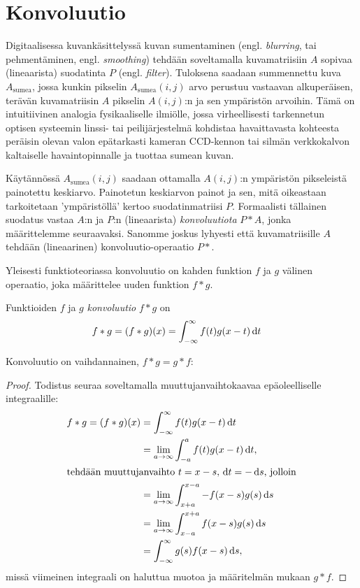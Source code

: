 \section{Konvoluutio}
\label{sec:konvoluutio}

Digitaalisessa kuvankäsittelyssä kuvan sumentaminen (engl. \emph{blurring}, tai pehmentäminen, engl. \emph{smoothing}) tehdään soveltamalla kuvamatriisiin $A$ sopivaa (lineaarista) suodatinta $P$ (engl. \emph{filter}).
Tuloksena saadaan summennettu kuva $A_\text{sumea}$, jossa kunkin pikselin $A_\text{sumea}(i,j)$ arvo perustuu vastaavan alkuperäisen, terävän kuvamatriisin $A$ pikselin $A(i,j)$:n ja sen ympäristön arvoihin.
Tämä on intuitiivinen analogia fysikaaliselle ilmiölle, jossa virheellisesti tarkennetun optisen systeemin linssi- tai peilijärjestelmä kohdistaa havaittavasta kohteesta peräisin olevan valon epätarkasti kameran CCD-kennon tai silmän verkkokalvon kaltaiselle havaintopinnalle ja tuottaa sumean kuvan.

Käytännössä $A_\text{sumea}(i,j)$ saadaan ottamalla $A(i,j)$:n ympäristön pikseleistä painotettu keskiarvo.
Painotetun keskiarvon painot ja sen, mitä oikeastaan tarkoitetaan 'ympäristöllä' kertoo suodatinmatriisi $P$.
Formaalisti tällainen suodatus vastaa $A$:n ja $P$:n (lineaarista) \emph{konvoluutiota} $P \ast A$, jonka määrittelemme seuraavaksi.
Sanomme joskus lyhyesti että kuvamatriisille $A$ tehdään (lineaarinen) konvoluutio-operaatio $P \ast$.
\cite{burger09}

Yleisesti funktioteoriassa konvoluutio on kahden funktion $f$ ja $g$ välinen operaatio, joka määrittelee uuden funktion $f \ast g$.
\begin{maar}
    Funktioiden $f$ ja $g$ \emph{konvoluutio} $f \ast g$ on
    \begin{align*}
        f \ast g = (f \ast g) (x)
        &= \int_{-\infty}^{\infty}f(t)g(x - t)\, \mathrm{d} t
    \end{align*}
\end{maar}

\begin{lause}
    Konvoluutio on vaihdannainen, $f \ast g = g \ast f$:
\end{lause}

\begin{proof}
    Todistus seuraa soveltamalla muuttujanvaihtokaavaa epäoleelliselle integraalille:
    \begin{align*}
        f \ast g = (f \ast g) (x)
        &= \int_{-\infty}^{\infty}f(t)g(x - t)\, \mathrm{d} t \\
        &= \lim_{a \to \infty} \int_{-a}^a f(t)g(x-t)\, \mathrm{d} t, \\
        \intertext{tehdään muuttujanvaihto $t = x - s, \, \mathrm{d} t = -\, \mathrm{d} s$, jolloin}
        &= \lim_{a \to \infty} \int_{x + a}^{x - a} -f(x - s)g(s)\, \mathrm{d} s\\
        &= \lim_{a \to \infty} \int_{x - a}^{x + a} f(x - s)g(s)\, \mathrm{d} s\\
        &= \int_{-\infty}^{\infty}g(s)f(x -s)\, \mathrm{d} s,
    \end{align*}
    missä viimeinen integraali on haluttua muotoa ja määritelmän mukaan $g \ast f$.
\end{proof}


